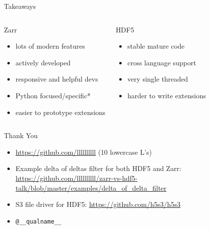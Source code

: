 \documentclass{beamer}
\begin{document}
\begin{frame}{Takeaways}
  \begin{columns}
    \begin{block}{Zarr}
      \begin{itemize}
      \item lots of modern features
      \item actively developed
      \item responsive and helpful devs
      \item Python focused/specific*
      \item easier to prototype extensions
      \end{itemize}
    \end{block}

    \begin{block}{HDF5}
      \begin{itemize}
      \item stable mature code
      \item cross language support
      \item very single threaded
      \item harder to write extensions
      \end{itemize}
    \end{block}
  \end{columns}
\end{frame}

\begin{frame}{Thank You}
  \begin{itemize}
  \item \url{https://github.com/llllllllll} (10 lowercase L's)
  \item Example delta of deltas filter for both HDF5 and Zarr:
    \url{https://github.com/llllllllll/zarr-vs-hdf5-talk/blob/master/examples/delta_of_delta_filter}
  \item S3 file driver for HDF5: \url{https://github.com/h5s3/h5s3}
  \item \texttt{@\_\_qualname\_\_}
  \end{itemize}
\end{frame}
\end{document}
